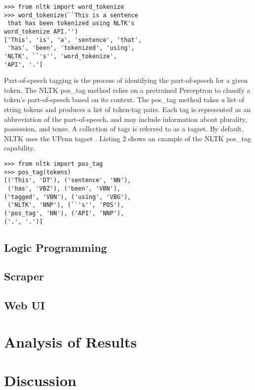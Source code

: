 \documentclass{chi2009}
\begin{document}
\begin{lstlisting}[caption=NLTK Tokenization Example, label=tokList]
>>> from nltk import word_tokenize
>>> word_tokenize(``This is a sentence
 that has been tokenized using NLTK's 
word_tokenize API.'')
['This', 'is', 'a', 'sentence', 'that',
 'has', 'been', 'tokenized', 'using', 
'NLTK', ``'s'', 'word_tokenize', 
'API', '.']
\end{lstlisting}

Part-of-speech tagging is the process of identifying the part-of-speech for a given token.  The NLTK pos\_tag method relies on a pretrained Perceptron to classify a token's part-of-speech based on its context.  The pos\_tag method takes a list of string tokens and produces a list of token-tag pairs.  Each tag is represented as an abbreviation of the part-of-speech, and may include information about plurality, possession, and tense.  A collection of tags is referred to as a tagset.  By default, NLTK uses the UPenn tagset \cite{upenn_tags}.  Listing 2 shows an example of the NLTK pos\_tag capability.

\begin{lstlisting}[caption=NLTK POS Tagger Example, label=tagList]
>>> from nltk import pos_tag
>>> pos_tag(tokens)
[('This', 'DT'), ('sentence', 'NN'),
 ('has', 'VBZ'), ('been', 'VBN'), 
('tagged', 'VBN'), ('using', 'VBG'),
 ('NLTK', 'NNP'), (``'s'', 'POS'), 
('pos_tag', 'NN'), ('API', 'NNP'), 
('.', '.')]
\end{lstlisting}

\subsection{Logic Programming}

\subsection{Scraper}

\subsection{Web UI}


\section{Analysis of Results}


\section{Discussion}
\end{document}
